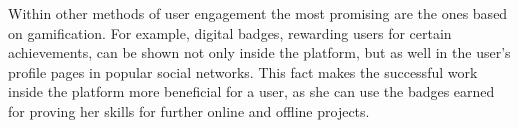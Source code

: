 \documentclass[PhD, Submit, ngerman,UKenglish,table]{scrbook}
\begin{document}
Within other methods of user engagement the most promising are the ones based on gamification.
For example, digital badges, rewarding users for certain achievements, can be shown not only inside the platform, but as well in the user's profile pages in popular social networks.
This fact makes the successful work inside the platform more beneficial for a user, as she can use the badges earned for proving her skills for further online and offline projects. 




\end{document}
